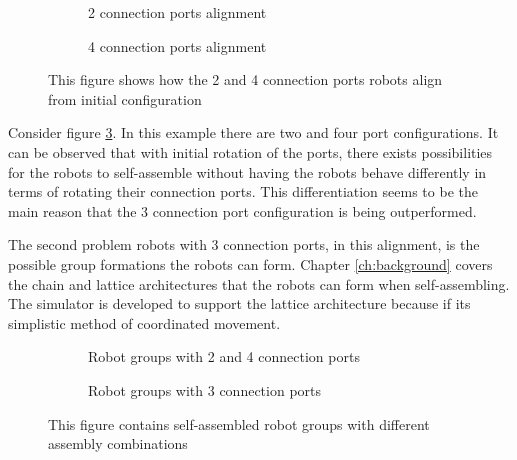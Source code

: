 \begin{figure}[H]
	\begin{subfigure}[t]{0.49\textwidth}
		\centering
		\caption{2 connection ports alignment}
		\label{2-port-guided-allignment}
	\end{subfigure}
	\begin{subfigure}[t]{0.49\textwidth}
		\centering
		\caption{4 connection ports alignment}
		\label{4-port-guided-allignment}
	\end{subfigure}
	\caption{This figure shows how the 2 and 4 connection ports robots align from initial configuration}
	\label{2-4-port-guided-allignment}
\end{figure}

Consider figure \ref{2-4-port-guided-allignment}.
In this example there are two and four port configurations.
It can be observed that with initial rotation of the ports, there exists possibilities for the robots to self-assemble without having the robots behave differently in terms of rotating their connection ports.
This differentiation seems to be the main reason that the 3 connection port configuration is being outperformed.

The second problem robots with 3 connection ports, in this alignment, is the possible group formations the robots can form.
Chapter \ref{ch:background} covers the chain and lattice architectures that the robots can form when self-assembling. %
The simulator is developed to support the lattice architecture because if its simplistic method of coordinated movement.

\begin{figure}[H]
	\begin{subfigure}[t]{0.49\textwidth}
		\centering
		\caption{Robot groups with 2 and 4 connection ports}
		\label{2-4-port-architecture}
	\end{subfigure}
	\begin{subfigure}[t]{0.49\textwidth}
		\centering
		\caption{Robot groups with 3 connection ports}
		\label{3-port-architecture}
	\end{subfigure}
	\caption{This figure contains self-assembled robot groups with different assembly combinations}
	\label{port-architectures}
\end{figure}

